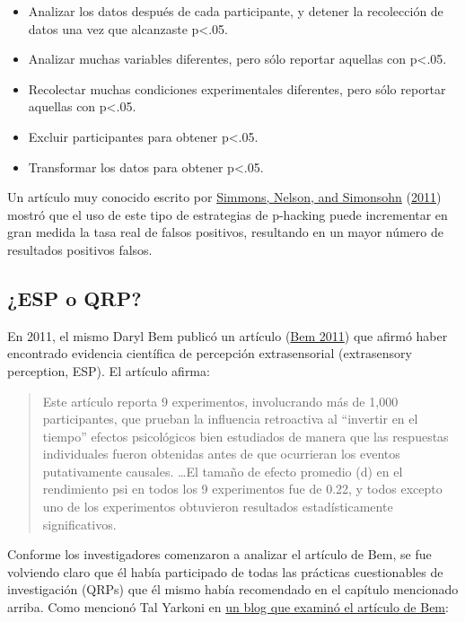 \documentclass[
  12pt,
]{book}
\providecommand{\tightlist}{%
  \setlength{\itemsep}{0pt}\setlength{\parskip}{0pt}}
\theoremstyle{definition}
\theoremstyle{definition}
\theoremstyle{definition}
\theoremstyle{remark}
\begin{document}
\begin{itemize}
\tightlist
\item
  Analizar los datos después de cada participante, y detener la recolección de datos una vez que alcanzaste p\textless.05.
\item
  Analizar muchas variables diferentes, pero sólo reportar aquellas con p\textless.05.
\item
  Recolectar muchas condiciones experimentales diferentes, pero sólo reportar aquellas con p\textless.05.
\item
  Excluir participantes para obtener p\textless.05.
\item
  Transformar los datos para obtener p\textless.05.
\end{itemize}

Un artículo muy conocido escrito por \protect\hyperlink{ref-simm:nels:simo:2011}{Simmons, Nelson, and Simonsohn} (\protect\hyperlink{ref-simm:nels:simo:2011}{2011}) mostró que el uso de este tipo de estrategias de p-hacking puede incrementar en gran medida la tasa real de falsos positivos, resultando en un mayor número de resultados positivos falsos.

\hypertarget{esp-o-qrp}{%
\subsection{¿ESP o QRP?}\label{esp-o-qrp}}

En 2011, el mismo Daryl Bem publicó un artículo (\protect\hyperlink{ref-bem:2011}{Bem 2011}) que afirmó haber encontrado evidencia científica de percepción extrasensorial (extrasensory perception, ESP). El artículo afirma:

\begin{quote}
Este artículo reporta 9 experimentos, involucrando más de 1,000 participantes, que prueban la influencia retroactiva al ``invertir en el tiempo'' efectos psicológicos bien estudiados de manera que las respuestas individuales fueron obtenidas antes de que ocurrieran los eventos putativamente causales. \ldots El tamaño de efecto promedio (d) en el rendimiento psi en todos los 9 experimentos fue de 0.22, y todos excepto uno de los experimentos obtuvieron resultados estadísticamente significativos.
\end{quote}

Conforme los investigadores comenzaron a analizar el artículo de Bem, se fue volviendo claro que él había participado de todas las prácticas cuestionables de investigación (QRPs) que él mismo había recomendado en el capítulo mencionado arriba. Como mencionó Tal Yarkoni en \href{http://www.talyarkoni.org/blog/2011/01/10/the-psychology-of-parapsychology-or-why-good-researchers-publishing-good-articles-in-good-journals-can-still-get-it-totally-wrong/}{un blog que examinó el artículo de Bem}:
\end{document}
